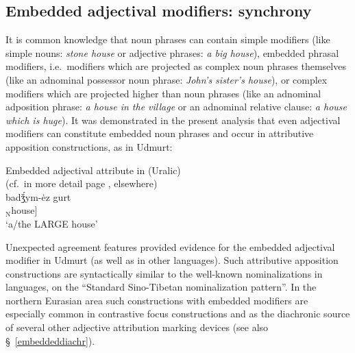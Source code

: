 \subsection{Embedded adjectival modifiers: synchrony} \label{embeddedsynchr}
It is common knowledge that noun phrases can contain simple modifiers (like simple nouns: \textit{stone house} or adjective phrases: \textit{a big house}), embedded phrasal modifiers, i.e.~modifiers which are projected as complex noun phrases themselves (like an adnominal possessor noun phrase: \textit{John's sister's house}), or complex modifiers which are projected higher than noun phrases (like an adnominal adposition phrase: \textit{a house in the village} or an adnominal relative clause: \textit{a house which is huge}). It was demonstrated in the present analysis that even adjectival modifiers can constitute embedded noun phrases and occur in attributive apposition constructions, as in Udmurt:
\begin{exe}
\ex \rm{Embedded adjectival attribute in  (Uralic)}\\(cf.~in more detail page \pageref{udmurt synchr}, elsewhere)\\
\gll	{}		{}		badǯ́ym-ėz gurt\\
	[$_{\text{NP}}$ 	[$_{\text{NP'}}$ $_{\text{A}}$big-\textsc{nmlz}] $_{\text{N}}$house]\\
\glt	‘a/the LARGE house’
\end{exe}
Unexpected agreement features provided evidence for the embedded adjectival modifier in Udmurt (as well as in other languages). Such attributive apposition constructions are syntactically similar to the well-known nominalizations in  languages, \citealt[cf.][]{bickel1999} on the “Standard Sino-Tibetan nominalization pattern”. In the northern Eurasian area such constructions with embedded modifiers are especially  common in contrastive focus constructions and as the diachronic source of several other adjective attribution marking devices (see also \S~\ref{embeddeddiachr}). 

